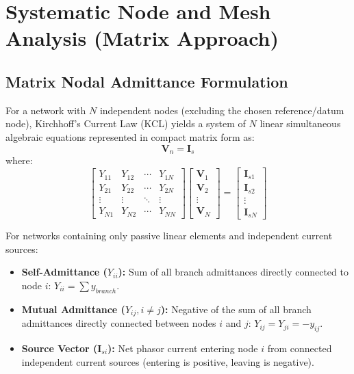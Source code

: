 \documentclass[12pt,a4paper]{article}
\begin{document}
\section{Systematic Node and Mesh Analysis (Matrix Approach)}

\subsection{Matrix Nodal Admittance Formulation}
For a network with $N$ independent nodes (excluding the chosen reference/datum node), Kirchhoff's Current Law (KCL) yields a system of $N$ linear simultaneous algebraic equations represented in compact matrix form as:
\begin{equation}
  [\mathbf{Y}] \mathbf{V}_n = \mathbf{I}_s
\end{equation}
where:
\begin{equation}
  \begin{bmatrix}
    Y_{11} & Y_{12} & \cdots & Y_{1N} \\
    Y_{21} & Y_{22} & \cdots & Y_{2N} \\
    \vdots & \vdots & \ddots & \vdots \\
    Y_{N1} & Y_{N2} & \cdots & Y_{NN}
  \end{bmatrix}
  \begin{bmatrix}
    \mathbf{V}_1 \\ \mathbf{V}_2 \\ \vdots \\ \mathbf{V}_N
  \end{bmatrix}
  =
  \begin{bmatrix}
    \mathbf{I}_{s1} \\ \mathbf{I}_{s2} \\ \vdots \\ \mathbf{I}_{sN}
  \end{bmatrix}
\end{equation}

\begin{tcolorbox}[formulabox, title={\textbf{Inspection Rules for Nodal Admittance Matrix $[\mathbf{Y}]$}}]
For networks containing only passive linear elements and independent current sources:
\begin{itemize}[leftmargin=*, itemsep=2pt]
  \item \textbf{Self-Admittance ($Y_{ii}$):} Sum of all branch admittances directly connected to node $i$: $Y_{ii} = \sum y_{branch}$.
  \item \textbf{Mutual Admittance ($Y_{ij}, i \ne j$):} Negative of the sum of all branch admittances directly connected between nodes $i$ and $j$: $Y_{ij} = Y_{ji} = -y_{ij}$.
  \item \textbf{Source Vector ($\mathbf{I}_{si}$):} Net phasor current entering node $i$ from connected independent current sources (entering is positive, leaving is negative).
\end{itemize}
\end{tcolorbox}
\end{document}
